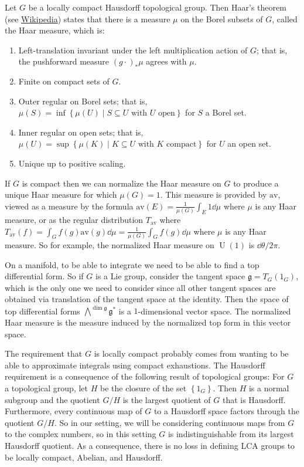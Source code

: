 \documentclass[11pt,leqno]{article}
\theoremstyle{plain}
\theoremstyle{definition}
\numberwithin{equation}{section}
\numberwithin{lem}{section}
\newcommand{\cbr}[1]{\left\{#1\right\}}
\DeclareMathOperator{\U}{U}
\newcommand{\av}{\mathrm{av}}
\begin{document}
Let $G$ be a locally compact Hausdorff topological group. Then Haar's theorem (see \href{https://en.wikipedia.org/wiki/Haar_measure}{Wikipedia}) states that there is a measure $\mu$ on the Borel subsets of $G$, called the Haar measure, which is:
\begin{enumerate}
	\item Left-translation invariant under the left multiplication action of $G$; that is, the pushforward measure $(g\cdot)_\ast \mu$ agrees with $\mu$.
	\item Finite on compact sets of $G$.
	\item Outer regular on Borel sets; that is, $\mu(S) = \inf\cbr{\mu(U)\mid S\subseteq U\text{ with $U$ open}}$ for $S$ a Borel set. 
	\item Inner regular on open sets; that is, $\mu(U) = \sup\cbr{\mu(K)\mid K\subseteq U\text{ with $K$ compact}}$ for $U$ an open set.
	\item Unique up to positive scaling.
\end{enumerate}

If $G$ is compact then we can normalize the Haar measure on $G$ to produce a unique Haar measure for which $\mu(G) = 1$. This measure is provided by $\av$, viewed as a measure by the formula $\av(E) = \frac{1}{\mu(G)}\int_E 1 \dd\mu$ where $\mu$ is any Haar measure, or as the regular distribution $T_\av$ where $T_\av(f) = \int_G f(g)\av(g)\dd\mu = \frac{1}{\mu(G)}\int_G f(g) \dd\mu$ where $\mu$ is any Haar measure. So for example, the normalized Haar measure on $\U(1)$ is $\dd\theta/2\pi$.

On a manifold, to be able to integrate we need to be able to find a top differential form. So if $G$ is a Lie group, consider the tangent space $\mathfrak g = T_G(1_G)$, which is the only one we need to consider since all other tangent spaces are obtained via translation of the tangent space at the identity. Then the space of top differential forms $\bigwedge^{\dim \mathfrak g}\mathfrak g^\ast$ is a $1$-dimensional vector space. The normalized Haar measure is the measure induced by the normalized top form in this vector space.

The requirement that $G$ is locally compact probably comes from wanting to be able to approximate integrals using compact exhaustions. The Hausdorff requirement is a consequence of the following result of topological groups: For $G$ a topological group, let $H$ be the closure of the set $\cbr{1_G}$. Then $H$ is a normal subgroup and the quotient $G/H$ is the largest quotient of $G$ that is Hausdorff. Furthermore, every continuous map of $G$ to a Hausdorff space factors through the quotient $G/H$. So in our setting, we will be considering continuous maps from $G$ to the complex numbers, so in this setting $G$ is indistinguishable from its largest Hausdorff quotient. As a consequence, there is no loss in defining LCA groups to be locally compact, Abelian, and Hausdorff.
\end{document}
